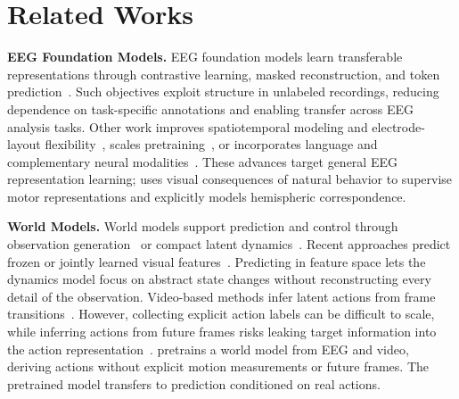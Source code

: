 \section{Related Works}

\noindent\textbf{EEG Foundation Models.}
EEG foundation models learn transferable representations through contrastive learning, masked reconstruction, and token prediction~\citep{kostas2021bendr,chien2022maeeg,jiang2024large,wang2024eegpt}. Such objectives exploit structure in unlabeled recordings, reducing dependence on task-specific annotations and enabling transfer across EEG analysis tasks. Other work improves spatiotemporal modeling and electrode-layout flexibility~\citep{wang2025cbramod,wang2025eegmamba,doner2025luna}, scales pretraining~\citep{ouahidi2025reve}, or incorporates language and complementary neural modalities~\citep{jiang2025neurolm,xiao2025brainomni}. These advances target general EEG representation learning; \mwm{} uses visual consequences of natural behavior to supervise motor representations and explicitly models hemispheric correspondence.

\noindent\textbf{World Models.}
World models support prediction and control through observation generation~\citep{ha2018recurrent,micheli2023transformers,alonso2024diffusion} or compact latent dynamics~\citep{hafner2020dream,hansen2024tdmpc2}. Recent approaches predict frozen or jointly learned visual features~\citep{zhou2025dinowm,sobal2025rewardfree,assran2025vjepa2,maes2026leworldmodel}. Predicting in feature space lets the dynamics model focus on abstract state changes without reconstructing every detail of the observation. Video-based methods infer latent actions from frame transitions~\citep{bruce2024genie,gao2025adaworld,garrido2026lawm}. However, collecting explicit action labels can be difficult to scale, while inferring actions from future frames risks leaking target information into the action representation~\citep{garrido2026lawm}. \mwm{} pretrains a world model from EEG and video, deriving actions without explicit motion measurements or future frames. The pretrained model transfers to prediction conditioned on real actions.
